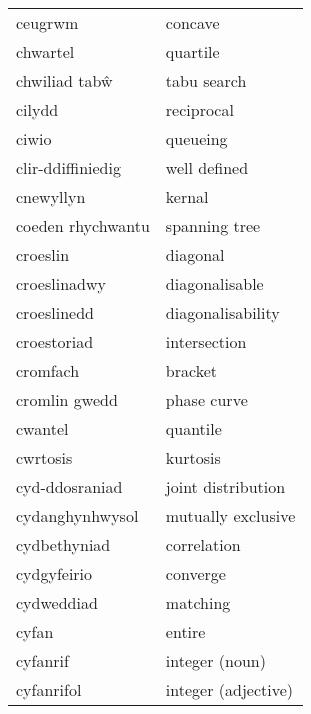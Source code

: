 \begin{supertabular}{p{0.22\textwidth}p{0.22\textwidth}}
                        ceugrwm &                          concave \\
                       chwartel &                         quartile \\
                  chwiliad tabŵ &                      tabu search \\
                         cilydd &                       reciprocal \\
                          ciwio &                         queueing \\
              clir-ddiffiniedig &                     well defined \\
                      cnewyllyn &                           kernal \\
              coeden rhychwantu &                    spanning tree \\
                       croeslin &                         diagonal \\
                   croeslinadwy &                   diagonalisable \\
                    croeslinedd &                diagonalisability \\
                    croestoriad &                     intersection \\
                       cromfach &                          bracket \\
                  cromlin gwedd &                      phase curve \\
                        cwantel &                         quantile \\
                       cwrtosis &                         kurtosis \\
                 cyd-ddosraniad &               joint distribution \\
                cydanghynhwysol &               mutually exclusive \\
                   cydbethyniad &                      correlation \\
                    cydgyfeirio &                         converge \\
                     cydweddiad &                         matching \\
                          cyfan &                           entire \\
                       cyfanrif &                   integer (noun) \\
                     cyfanrifol &              integer (adjective) \\

\end{supertabular}
